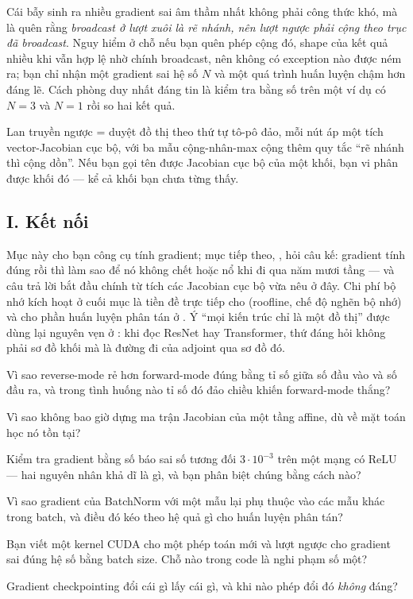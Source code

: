 \documentclass[../../../deep_learning.tex]{subfiles}
\begin{document}
\begin{cambay}
Cái bẫy sinh ra nhiều gradient sai âm thầm nhất không phải công thức khó, mà là quên rằng \emph{broadcast ở lượt xuôi là rẽ nhánh, nên lượt ngược phải cộng theo trục đã broadcast}. Nguy hiểm ở chỗ nếu bạn quên phép cộng đó, shape của kết quả nhiều khi vẫn hợp lệ nhờ chính broadcast, nên không có exception nào được ném ra; bạn chỉ nhận một gradient sai hệ số \(N\) và một quá trình huấn luyện chậm hơn đáng lẽ. Cách phòng duy nhất đáng tin là kiểm tra bằng số trên một ví dụ có \(N=3\) và \(N=1\) rồi so hai kết quả.
\end{cambay}

\begin{cannho}
Lan truyền ngược = duyệt đồ thị theo thứ tự tô-pô đảo, mỗi nút áp một tích vector-Jacobian cục bộ, với ba mẫu cộng-nhân-max cộng thêm quy tắc ``rẽ nhánh thì cộng dồn''. Nếu bạn gọi tên được Jacobian cục bộ của một khối, bạn vi phân được khối đó --- kể cả khối bạn chưa từng thấy. 
\end{cannho}

\subsection{I. Kết nối}
Mục này cho bạn công cụ tính gradient; mục tiếp theo, , hỏi câu kế: gradient tính đúng rồi thì làm sao để nó không chết hoặc nổ khi đi qua năm mươi tầng --- và câu trả lời bắt đầu chính từ tích các Jacobian cục bộ vừa nêu ở đây. Chi phí bộ nhớ kích hoạt ở cuối mục là tiền đề trực tiếp cho  (roofline, chế độ nghẽn bộ nhớ) và cho phần huấn luyện phân tán ở . Ý ``mọi kiến trúc chỉ là một đồ thị'' được dùng lại nguyên vẹn ở : khi đọc ResNet hay Transformer, thứ đáng hỏi không phải sơ đồ khối mà là đường đi của adjoint qua sơ đồ đó.

\begin{tukiem}
\item Vì sao reverse-mode rẻ hơn forward-mode đúng bằng tỉ số giữa số đầu vào và số đầu ra, và trong tình huống nào tỉ số đó đảo chiều khiến forward-mode thắng?
\item Vì sao không bao giờ dựng ma trận Jacobian của một tầng affine, dù về mặt toán học nó tồn tại?
\item Kiểm tra gradient bằng số báo sai số tương đối \(3\cdot 10^{-3}\) trên một mạng có ReLU --- hai nguyên nhân khả dĩ là gì, và bạn phân biệt chúng bằng cách nào?
\item Vì sao gradient của BatchNorm với một mẫu lại phụ thuộc vào các mẫu khác trong batch, và điều đó kéo theo hệ quả gì cho huấn luyện phân tán?
\item Bạn viết một kernel CUDA cho một phép toán mới và lượt ngược cho gradient sai đúng hệ số bằng batch size. Chỗ nào trong code là nghi phạm số một?
\item Gradient checkpointing đổi cái gì lấy cái gì, và khi nào phép đổi đó \emph{không} đáng?
\end{tukiem}
\ifSubfilesClassLoaded{\printbibliography[title={Nguồn}]}{}
\end{document}
